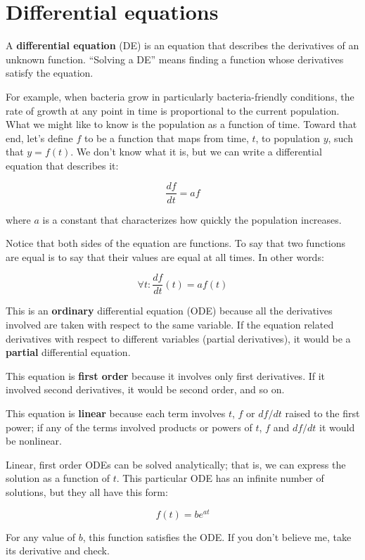 \documentclass{book}
\begin{document}
\section{Differential equations}

A {\bf differential equation} (DE) is an equation that describes the
derivatives of an unknown function.  ``Solving a DE'' means finding a
function whose derivatives satisfy the equation.

For example, when bacteria grow in particularly bacteria-friendly
conditions, the rate of growth at any point in time is proportional to
the current population.  What we might like to know is the population
as a function of time.  Toward that end, let's define $f$ to be a
function that maps from time, $t$, to population $y$, 
such that $y = f(t)$.  We don't
know what it is, but we can write a differential equation
that describes it:

\[ \frac{df}{dt} = a f \]

where $a$ is a constant that characterizes how quickly the population
increases.

Notice that both sides of the equation are functions.  To say that
two functions are equal is to say that their values are equal at
all times.  In other words:

\[ \forall t: \frac{df}{dt}(t) = a f(t) \]

This is an {\bf ordinary} differential equation (ODE) because all the
derivatives involved are taken with respect to the
same variable.  If the equation related derivatives with respect to
different variables (partial derivatives), it would be a {\bf partial}
differential equation.

This equation is {\bf first order} because it involves only first
derivatives.  If it involved second derivatives, it would be second order,
and so on.

This equation is {\bf linear} because each term involves $t$, $f$ or
$df/dt$ raised to the first power; if any of the terms involved
products or powers of $t$, $f$ and $df/dt$ it would be
nonlinear.

Linear, first order ODEs can be solved analytically; that is, we
can express the solution as a function of $t$.
This particular ODE has an infinite number of solutions, but
they all have this form:

\[ f(t) = b e^{at} \]

For any value of $b$, this function satisfies the ODE.  If
you don't believe me, take its derivative and check.
\end{document}

